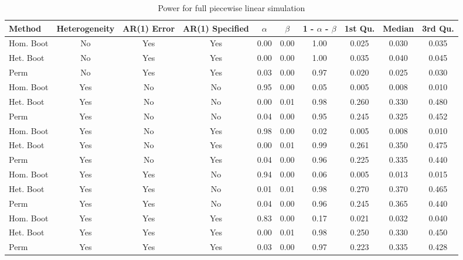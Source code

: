 \documentclass{article}
\begin{document}
\begin{landscape}
\begin{table}[ht]
\centering
\begin{tabular}{lccccccccc}
  \hline
Method & Heterogeneity & AR(1) Error & AR(1) Specified & $\alpha$ & $\beta$ & 1 - $\alpha$ - $\beta$ & 1st Qu. & Median & 3rd Qu.  \\ 
  \hline
Hom. Boot & No & Yes & Yes & 0.00 & 0.00 & 1.00 & 0.025 & 0.030 & 0.035 \\ 
  Het. Boot & No & Yes & Yes & 0.00 & 0.00 & 1.00 & 0.035 & 0.040 & 0.045 \\ 
  Perm & No & Yes & Yes & 0.03 & 0.00 & 0.97 & 0.020 & 0.025 & 0.030 \\ \hline
  Hom. Boot & Yes & No & No & 0.95 & 0.00 & 0.05 & 0.005 & 0.008 & 0.010 \\ 
  Het. Boot & Yes & No & No & 0.00 & 0.01 & 0.98 & 0.260 & 0.330 & 0.480 \\ 
  Perm & Yes & No & No & 0.04 & 0.00 & 0.95 & 0.245 & 0.325 & 0.452 \\ \hline
  Hom. Boot & Yes & No & Yes & 0.98 & 0.00 & 0.02 & 0.005 & 0.008 & 0.010 \\ 
  Het. Boot & Yes & No & Yes & 0.00 & 0.01 & 0.99 & 0.261 & 0.350 & 0.475 \\ 
  Perm & Yes & No & Yes & 0.04 & 0.00 & 0.96 & 0.225 & 0.335 & 0.440 \\ \hline
  Hom. Boot & Yes & Yes & No & 0.94 & 0.00 & 0.06 & 0.005 & 0.013 & 0.015 \\ 
  Het. Boot & Yes & Yes & No & 0.01 & 0.01 & 0.98 & 0.270 & 0.370 & 0.465 \\ 
  Perm & Yes & Yes & No & 0.04 & 0.00 & 0.96 & 0.245 & 0.365 & 0.440 \\ \hline
  Hom. Boot & Yes & Yes & Yes & 0.83 & 0.00 & 0.17 & 0.021 & 0.032 & 0.040 \\ 
  Het. Boot & Yes & Yes & Yes & 0.00 & 0.01 & 0.98 & 0.250 & 0.330 & 0.450 \\ 
  Perm & Yes & Yes & Yes & 0.03 & 0.00 & 0.97 & 0.223 & 0.335 & 0.428 \\ 
   \hline
\end{tabular}
\caption{Power for full piecewise linear simulation} 
\label{tab:power_methods_full}
\end{table}
\end{landscape}
\end{document}
